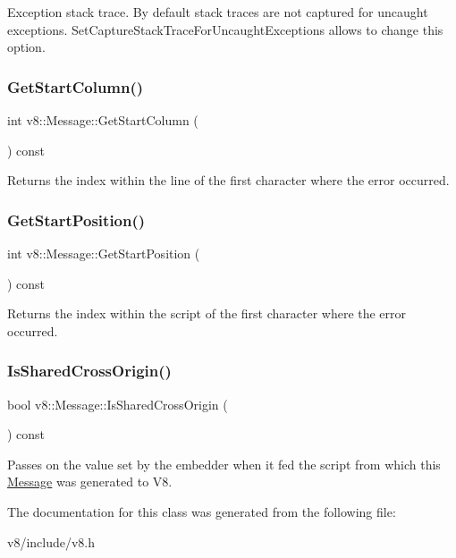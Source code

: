 Exception stack trace. By default stack traces are not captured for uncaught exceptions. Set\+Capture\+Stack\+Trace\+For\+Uncaught\+Exceptions allows to change this option. \mbox{\label{classv8_1_1Message_a3be9714cc977899bc1c935b00a140969}} 
\subsubsection{\texorpdfstring{Get\+Start\+Column()}{GetStartColumn()}}
{\footnotesize\ttfamily int v8\+::\+Message\+::\+Get\+Start\+Column (\begin{DoxyParamCaption}{ }\end{DoxyParamCaption}) const}

Returns the index within the line of the first character where the error occurred. \mbox{\label{classv8_1_1Message_a8c32ad25c164ecec1bae0293449589f4}} 
\subsubsection{\texorpdfstring{Get\+Start\+Position()}{GetStartPosition()}}
{\footnotesize\ttfamily int v8\+::\+Message\+::\+Get\+Start\+Position (\begin{DoxyParamCaption}{ }\end{DoxyParamCaption}) const}

Returns the index within the script of the first character where the error occurred. \mbox{\label{classv8_1_1Message_a60e48ec814c324c443043dfaf366590a}} 
\subsubsection{\texorpdfstring{Is\+Shared\+Cross\+Origin()}{IsSharedCrossOrigin()}}
{\footnotesize\ttfamily bool v8\+::\+Message\+::\+Is\+Shared\+Cross\+Origin (\begin{DoxyParamCaption}{ }\end{DoxyParamCaption}) const}

Passes on the value set by the embedder when it fed the script from which this \mbox{\hyperlink{classv8_1_1Message}{Message}} was generated to V8. 

The documentation for this class was generated from the following file\+:\begin{DoxyCompactItemize}
\item 
v8/include/v8.\+h\end{DoxyCompactItemize}
